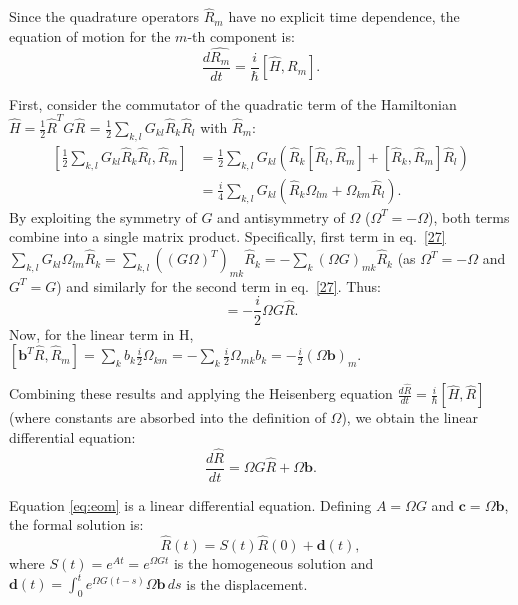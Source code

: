 Since the quadrature operators $\hat{R}_m$ have no explicit time dependence, the equation of motion for the $m$-th component is:
\begin{equation}
\frac{d\hat{R_m}}{dt} = \frac{i}{\hbar} [\hat{H}, \hat{R_m}].
\end{equation}

First, consider the commutator of the quadratic term of the Hamiltonian $\hat{H} = \frac{1}{2} \hat{R}^T G \hat{R}$ = $\frac{1}{2} \sum_{k,l} G_{kl} \hat{R}_k \hat{R}_l$  with $\hat{R}_m$:
\begin{align}
\left[ \frac{1}{2} \sum_{k,l} G_{kl} \hat{R}_k \hat{R}_l, \hat{R}_m \right] 
&= \frac{1}{2} \sum_{k,l} G_{kl} \left( \hat{R}_k [\hat{R}_l, \hat{R}_m] + [\hat{R}_k, \hat{R}_m] \hat{R}_l \right) \nonumber \\
&= \frac{i}{4} \sum_{k,l} G_{kl} \left( \hat{R}_k \Omega_{lm} + \Omega_{km} \hat{R}_l \right).
\label{27}
\end{align}
By exploiting the symmetry of $G$ and antisymmetry of $\Omega$ ($\Omega^T = -\Omega$), both terms combine into a single matrix product. Specifically, first term in eq.~\eqref{27} $\sum_{k,l} G_{kl} \Omega_{lm} \hat{R}_k = \sum_{k,l} ((G\Omega)^T)_{mk} \hat{R}_k = -\sum_k (\Omega G)_{mk} \hat{R}_k$  (as $\Omega^T = -\Omega$ and $G^T = G$) and similarly for the second term in eq.~\eqref{27}. Thus:
\begin{equation}
[\hat{H}_{quad}, \hat{R}] = -\frac{i}{2} \Omega G \hat{R}.
\end{equation}
Now, for the linear term in H, $[\mathbf{b}^T \hat{R}, \hat{R}_m] = \sum_k b_k \frac{i}{2} \Omega_{km} = -\sum_k\frac{i}{2} \Omega_{mk} b_k  = -\frac{i}{2} (\Omega \mathbf{b})_m$.

Combining these results and applying the Heisenberg equation $\frac{d\hat{R}}{dt} = \frac{i}{\hbar} [\hat{H}, \hat{R}]$ (where constants are absorbed into the definition of $\Omega$), we obtain the linear differential equation:
\begin{equation}
\frac{d\hat{R}}{dt} = \Omega G \hat{R} + \Omega \mathbf{b}.
\label{eq:eom}
\end{equation}


Equation \ref{eq:eom} is a linear differential equation. Defining $A = \Omega G$ and $\mathbf{c} = \Omega \mathbf{b}$, the formal solution is:
\begin{equation}
\hat{R}(t) = S(t)\hat{R}(0) + \mathbf{d}(t),
\label{R}
\end{equation}
where $S(t) = e^{At} = e^{\Omega G t}$ is the homogeneous solution and $\mathbf{d}(t) = \int_0^t e^{\Omega G (t-s)} \Omega \mathbf{b} \, ds$ is the displacement.

